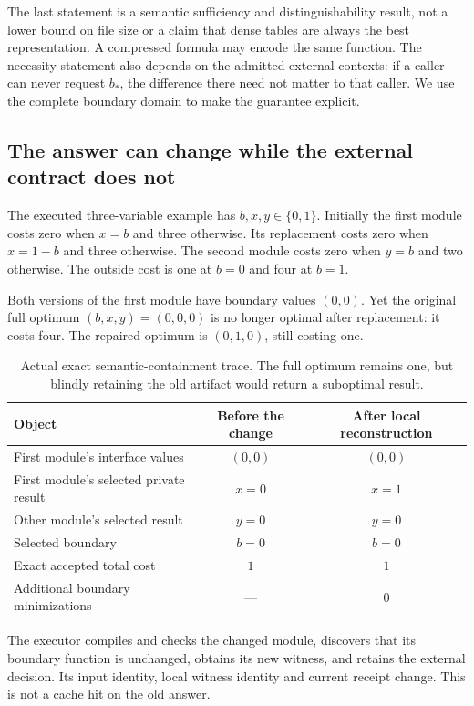 \documentclass[11pt,letterpaper]{article}
\theoremstyle{definition}\newtheorem{definition}[theorem]{Definition}
\theoremstyle{remark}\newtheorem{remark}[theorem]{Remark}
\begin{document}
The last statement is a semantic sufficiency and distinguishability result, not a lower bound on file size or a claim that dense tables are always the best representation. A compressed formula may encode the same function. The necessity statement also depends on the admitted external contexts: if a caller can never request $b_*$, the difference there need not matter to that caller. We use the complete boundary domain to make the guarantee explicit.

\subsection{The answer can change while the external contract does not}
The executed three-variable example has $b,x,y\in\{0,1\}$. Initially the first module costs zero when $x=b$ and three otherwise. Its replacement costs zero when $x=1-b$ and three otherwise. The second module costs zero when $y=b$ and two otherwise. The outside cost is one at $b=0$ and four at $b=1$.

Both versions of the first module have boundary values $(0,0)$. Yet the original full optimum $(b,x,y)=(0,0,0)$ is no longer optimal after replacement: it costs four. The repaired optimum is $(0,1,0)$, still costing one.

\begin{table}[htbp]\centering\small
\caption{Actual exact semantic-containment trace. The full optimum remains one, but blindly retaining the old artifact would return a suboptimal result.}
\begin{tabularx}{\linewidth}{@{}Ycc@{}}\toprule
Object & Before the change & After local reconstruction\\\midrule
First module's interface values & $(0,0)$ & $(0,0)$\\
First module's selected private result & $x=0$ & $x=1$\\
Other module's selected result & $y=0$ & $y=0$\\
Selected boundary & $b=0$ & $b=0$\\
Exact accepted total cost & $1$ & $1$\\
Additional boundary minimizations & --- & $0$\\\bottomrule
\end{tabularx}
\label{tab:containment}
\end{table}

The executor compiles and checks the changed module, discovers that its boundary function is unchanged, obtains its new witness, and retains the external decision. Its input identity, local witness identity and current receipt change. This is not a cache hit on the old answer.
\end{document}
